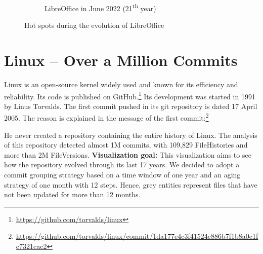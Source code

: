 \begin{figure}[ht]
\begin{subfigure}{0.48\textwidth}
        \caption{LibreOffice in June 2022 (21\textsuperscript{th} year)} 
        \label{fig:Libre_V6_S6}
    \end{subfigure}
    
    \caption{Hot spots during the evolution of LibreOffice} 
    \label{fig:Libre_V6}
\end{figure}


\clearpage
\section{Linux – Over a Million Commits}
Linux is an open-source kernel widely used and known for its efficiency and reliability. Its code is published on GitHub.\footnote{\url{https://github.com/torvalds/linux}} Its development was started in 1991 by Linus Torvalds. The first commit pushed in its git repository is dated 17 April 2005. The reason is explained in the message of the first commit:\footnote{\url{https://github.com/torvalds/linux/commit/1da177e4c3f41524e886b7f1b8a0c1fc7321cac2}}
\begin{displayquote}
\end{displayquote}
He never created a repository containing the entire history of Linux. The analysis of this repository detected almost 1M commits, with 109,829 FileHistories and more than 2M FileVersions. 
\bigbreak
\noindent
\textbf{Visualization goal:}
This visualization aims to see how the repository evolved through its last 17 years. We decided to adopt a commit grouping strategy based on a time window of one year and an aging strategy of one month with 12 steps. Hence, grey entities represent files that have not been updated for more than 12 months. 


